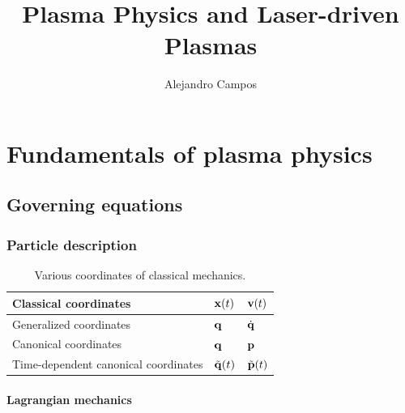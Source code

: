 \documentclass[a4paper,11pt]{report}
\title{Plasma Physics and Laser-driven Plasmas}
\author{Alejandro Campos}
\newcommand{\qvecdot}{\dot{\qvec}}
\begin{document}
\maketitle
\tableofcontents

\part{Fundamentals of plasma physics}

\chapter{Governing equations}

\section{Particle description}
\begin{table}[H]
    \renewcommand{\arraystretch}{1.5}
    \centering
    \caption{Various coordinates of classical mechanics. }
    \label{tb:classical_mechanics_coordinates}
     \begin{tabular}{|l|l|l|}
        \hline
        Classical coordinates & $\mathbf{x}(t)$ & $\mathbf{v}(t)$ \\
        \hline
        Generalized coordinates  & $\mathbf{q}$ & $\qvecdot$ \\
        \hline
        Canonical coordinates & $\mathbf{q}$ & $\mathbf{p}$ \\
        \hline
        Time-dependent canonical coordinates & $\tilde{\mathbf{q}}(t)$ & $ \tilde{\mathbf{p}}(t)$ \\
        \hline
     \end{tabular}
\end{table}
    
\subsection{Lagrangian mechanics}
    
\end{document}
